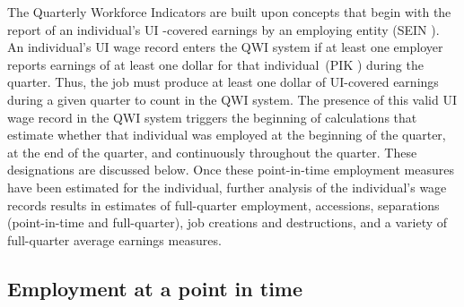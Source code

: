 The Quarterly Workforce Indicators are built upon concepts that begin with
the report of an individual's UI%
-covered earnings by an employing entity (SEIN%
). An individual's {UI} wage record enters the QWI system if at
least one employer reports earnings of at least one dollar for that
individual\ (PIK%
) during the quarter. Thus, the job must produce at least one
dollar of {UI}-covered earnings during a given quarter to count in the QWI
system. The presence of this valid {UI} wage record in the QWI system
triggers the beginning of calculations that estimate whether that individual
was employed at the beginning of the quarter, at the end of the quarter, and
continuously throughout the quarter. These designations are discussed below.
Once these point-in-time employment measures have been estimated for the
individual, further analysis of the individual's wage records results in
estimates of full-quarter employment, accessions, separations (point-in-time
and full-quarter), job creations and destructions, and a variety of
full-quarter average earnings measures.

\subsection{Employment at a point in time}


